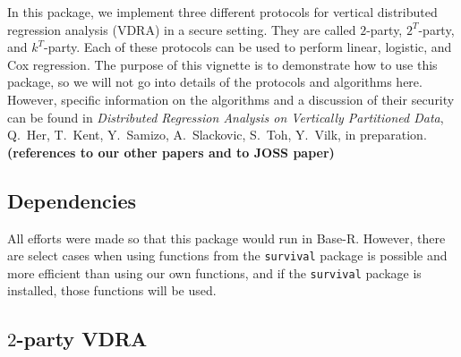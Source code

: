 \documentclass[12]{article}
\begin{document}
In this package, we implement three different protocols for vertical distributed regression analysis (VDRA) in a secure setting.  They are called $2$-party, $2^T$-party, and $k^T$-party.  Each of these protocols can be used to perform linear, logistic, and Cox regression.  The purpose of this vignette is to demonstrate how to use this package, so we will not go into details of the protocols and algorithms here.  However, specific information on the algorithms and a discussion of their security can be found in \textit{Distributed Regression Analysis on Vertically Partitioned Data}, Q.\ Her, T.\ Kent, Y.\ Samizo, A.\ Slackovic, S.\ Toh, Y.\ Vilk, in preparation.  \textbf{(references to our other papers and to JOSS paper)}

\subsection{Dependencies}

All efforts were made so that this package would run in Base-R.  However, there are select cases when using functions from the \verb"survival" package is possible and more efficient than using our own functions, and if the \verb"survival" package is installed, those functions will be used.

\subsection{$2$-party VDRA}
\end{document}
